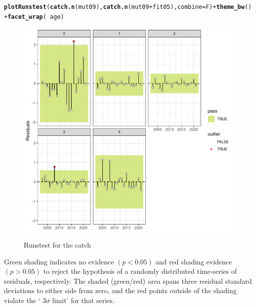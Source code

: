 \documentclass{article}\usepackage[]{graphicx}\usepackage[]{xcolor}
\makeatletter
\def\maxwidth{ %
  \ifdim\Gin@nat@width>\linewidth
    \linewidth
  \else
    \Gin@nat@width
  \fi
}
\newcommand{\hlopt}[1]{\textcolor[rgb]{0,0,0}{#1}}%
\newcommand{\hldef}[1]{\textcolor[rgb]{0.345,0.345,0.345}{#1}}%
\newcommand{\hlkwc}[1]{\textcolor[rgb]{0.333,0.667,0.333}{#1}}%
\newcommand{\hlkwd}[1]{\textcolor[rgb]{0.737,0.353,0.396}{\textbf{#1}}}%
\newenvironment{kframe}{%
 \def\at@end@of@kframe{}%
 \ifinner\ifhmode%
  \def\at@end@of@kframe{\end{minipage}}%
  \begin{minipage}{\columnwidth}%
 \fi\fi%
 \def\FrameCommand##1{\hskip\@totalleftmargin \hskip-\fboxsep
 \colorbox{shadecolor}{##1}\hskip-\fboxsep
     \hskip-\linewidth \hskip-\@totalleftmargin \hskip\columnwidth}%
 \MakeFramed {\advance\hsize-\width
   \@totalleftmargin\z@ \linewidth\hsize
   \@setminipage}}%
 {\par\unskip\endMakeFramed%
 \at@end@of@kframe}
\newenvironment{knitrout}{}{} %
\makeatother
\begin{document}
\begin{knitrout}
\color{fgcolor}\begin{kframe}
\begin{alltt}
\hlkwd{plotRunstest}\hldef{(}\hlkwd{catch.n}\hldef{(mut09),} \hlkwd{catch.n}\hldef{(mut09} \hlopt{+} \hldef{fit05),} \hlkwc{combine} \hldef{= F)} \hlopt{+} \hlkwd{theme_bw}\hldef{()} \hlopt{+} \hlkwd{facet_wrap}\hldef{(}\hlopt{~}\hldef{age)}
\end{alltt}
\end{kframe}\begin{figure}
\includegraphics[width=\maxwidth]{figure/catchrunstest-1} \caption[Runstest for the catch]{Runstest for the catch}\label{fig:catchrunstest}
\end{figure}

\end{knitrout}

Green shading indicates no evidence $(p <  0.05)$ and red shading evidence $(p  >0.05)$ to reject the hypothesis of a randomly distributed time-series of residuals, respectively. The shaded (green/red) area spans three residual standard deviations to either side from zero, and the red points outside of the shading violate the ‘ $3\sigma$ limit’ for that series.
\end{document}
